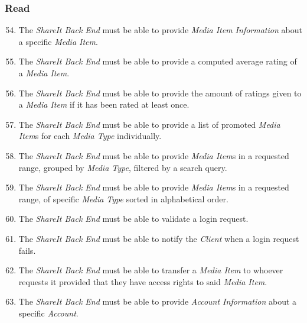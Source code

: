 \documentclass[../report.tex]{subfiles}
\begin{document}
\label{sec:Functional Requirements Server}

\noindent

\subsubsection{Read}
\begin{enumerate}[label=\textbf{FR-\twodigits*}]

\setcounter{enumi}{53}

\item The \textit{ShareIt Back End} must be able to provide \textit{Media Item Information} about a specific \textit{Media Item}.

\item The \textit{ShareIt Back End} must be able to provide a computed average rating of a \textit{Media Item}.

\item The \textit{ShareIt Back End} must be able to provide the amount of ratings given to a \textit{Media Item} if it has been rated at least once.

\item The \textit{ShareIt Back End} must be able to provide a list of promoted \textit{Media Item}s for each \textit{Media Type} individually.

\item The \textit{ShareIt Back End} must be able to provide \textit{Media Item}s in a requested range, grouped by \textit{Media Type}, filtered by a search query.

\item The \textit{ShareIt Back End} must be able to provide \textit{Media Item}s in a requested range, of specific \textit{Media Type} sorted in alphabetical order.

\item The \textit{ShareIt Back End} must be able to validate a login request.

\item The \textit{ShareIt Back End} must be able to notify the \textit{Client} when a login request fails.

\item The \textit{ShareIt Back End} must be able to transfer a \textit{Media Item} to whoever requests it provided that they have access rights to said \textit{Media Item}.

\item The \textit{ShareIt Back End} must be able to provide \textit{Account Information} about a specific \textit{Account}.


\end{enumerate}
\end{document}
